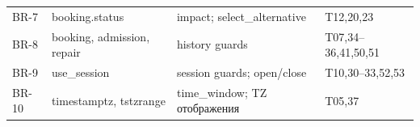 \begin{singlespace}
\begin{longtable}{>{\raggedright\arraybackslash}p{}>{\raggedright\arraybackslash}p{}>{\raggedright\arraybackslash}p{}>{\raggedright\arraybackslash}p{}}
BR-7 & booking.status & impact; select\_\allowbreak{}alternative & T12,20,23 \\
BR-8 & booking, admission, repair & history guards & T07,34–36,41,50,51 \\
BR-9 & use\_\allowbreak{}session & session guards; open/\allowbreak{}close & T10,30–33,52,53 \\
BR-10 & timestamptz, tstzrange & time\_\allowbreak{}window; TZ отображения & T05,37 \\
\bottomrule\end{longtable}\end{singlespace}